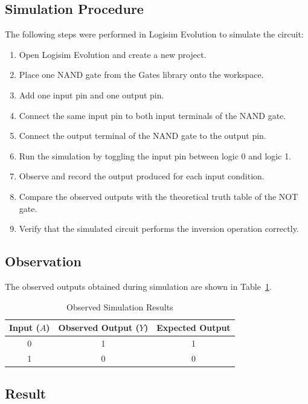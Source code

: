 \documentclass[12pt,a4paper]{article}
\begin{document}
\subsection{Simulation Procedure}

The following steps were performed in Logisim Evolution to simulate the circuit:

\begin{enumerate}
    \item Open Logisim Evolution and create a new project.
    \item Place one NAND gate from the Gates library onto the workspace.
    \item Add one input pin and one output pin.
    \item Connect the same input pin to both input terminals of the NAND gate.
    \item Connect the output terminal of the NAND gate to the output pin.
    \item Run the simulation by toggling the input pin between logic 0 and logic 1.
    \item Observe and record the output produced for each input condition.
    \item Compare the observed outputs with the theoretical truth table of the NOT gate.
    \item Verify that the simulated circuit performs the inversion operation correctly.
\end{enumerate}



\subsection{Observation}

The observed outputs obtained during simulation are shown in Table~\ref{tab:observation6}.

\begin{table}[H]
\centering
\caption{Observed Simulation Results}
\begin{tabular}{|c|c|c|}
\hline
Input ($A$) & Observed Output ($Y$) & Expected Output\\
\hline
0 & 1 & 1\\
\hline
1 & 0 & 0\\
\hline
\end{tabular}
\label{tab:observation6}
\end{table}

\subsection{Result}
\end{document}

